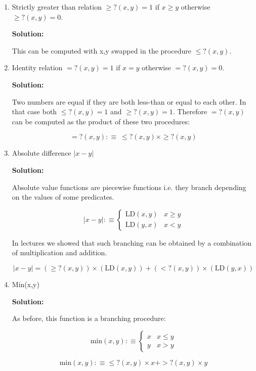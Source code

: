 \documentclass[11pt]{report}
\begin{document}
\begin{enumerate}
\begin{enumerate}
			{\bf Solution:}
			
			This can be computed with x,y swapped in the procedure for <?
			
			\item Strictly greater than relation $\geq ?(x,y) = 1$ if $x\geq y$ otherwise $\geq ?(x,y) = 0$.
			
			{\bf Solution:}

			This can be computed with x,y swapped in the procedure $\leq ?(x,y)$.

			\item Identity relation $=?(x,y) = 1$ if $x=y$ otherwise $=?(x,y) = 0$. 
			
			{\bf Solution:}

			Two numbers are equal if they are both less-than or equal to each other. In that case both $\leq ?(x,y) = 1$ and $\geq ?(x,y) = 1$. Therefore $=?(x,y)$ can be computed as the product of these two procedures: 

			$$=?(x,y) :\equiv \ \leq ?(x,y) \times \geq ?(x,y)$$
			
			\item Absolute difference $|x-y|$
			
			{\bf Solution:}
			
			Absolute value functions are piecewise functions i.e. they branch depending on the values of some predicates. 
			
			$$|x-y| :\equiv \begin{cases}
				\text{LD}(x,y) & x \geq y \\
				\text{LD}(y,x) & x < y
			\end{cases}$$
			
			In lectures we showed that such branching can be obtained by a combination of multiplication and addition.
			
			$$|x-y| = (\geq?(x,y))\times(\text{LD}(x,y)) + (<?(x,y))\times(\text{LD}(y,x))$$
			
			\item Min(x,y)
			
			{\bf Solution:}
			
			As before, this function is a branching procedure: 

			$$\text{min}(x,y) :\equiv \begin{cases}
				x & x \leq y \\
				y & x > y
			\end{cases}$$

			$$\text{min}(x,y) :\equiv \leq?(x,y) \times x + >?(x,y) \times y$$
			

\end{enumerate}
\end{enumerate}
\end{document}

